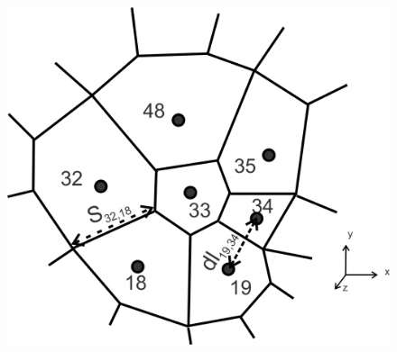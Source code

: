 \documentclass{article}
\begin{document}
\begin{figure}[H]
  \includegraphics[scale=0.6]{unstructured_mesh2.png}
  \label{fig:grid}
\end{figure}





\end{document}
